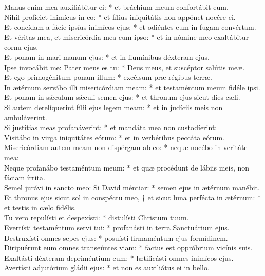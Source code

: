 {	Manus enim mea auxiliábitur ei: * et bráchium meum confortábit eum. \\
	Nihil profíciet inimícus in eo: * et fílius iniquitátis non appónet nocére ei. \\
	Et concídam a fácie ipsíus inimícos ejus: * et odiéntes eum in fugam convértam. \\
	Et véritas mea, et misericórdia mea cum ipso: * et in nómine meo exaltábitur cornu ejus. \\
	Et ponam in mari manum ejus: * et in flumínibus déxteram ejus. \\
	Ipse invocábit me: Pater meus es tu: * Deus meus, et suscéptor salútis meæ. \\
	Et ego primogénitum ponam illum: * excélsum præ régibus terræ. \\
	In ætérnum servábo illi misericórdiam meam: * et testaméntum meum fidéle ipsi. \\
	Et ponam in sǽculum sǽculi semen ejus: * et thronum ejus sicut dies cæli. \\
	Si autem derelíquerint fílii ejus legem meam: * et in judíciis meis non ambuláverint. \\
	Si justítias meas profanáverint: * et mandáta mea non custodíerint: \\
	Visitábo in virga iniquitátes eórum: * et in verbéribus peccáta eórum. \\
	Misericórdiam autem meam non dispérgam ab eo: * neque nocébo in veritáte mea: \\
	Neque profanábo testaméntum meum: * et quæ procédunt de lábiis meis, non fáciam írrita. \\
	Semel jurávi in sancto meo: Si David méntiar: * semen ejus in ætérnum manébit. \\
	Et thronus ejus sicut sol in conspéctu meo, † et sicut luna perfécta in ætérnum: * et testis in cælo fidélis. \\
	Tu vero repulísti et despexísti: * distulísti Christum tuum. \\
	Evertísti testaméntum servi tui: * profanásti in terra Sanctuárium ejus. \\
	Destruxísti omnes sepes ejus: * posuísti firmaméntum ejus formídinem. \\
	Diripuérunt eum omnes transeúntes viam: * factus est oppróbrium vicínis suis. \\
	Exaltásti déxteram depriméntium eum: * lætificásti omnes inimícos ejus. \\
	Avertísti adjutórium gládii ejus: * et non es auxiliátus ei in bello. \\
}
